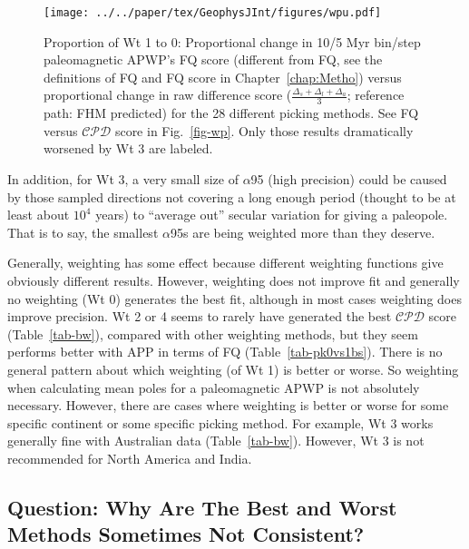\begin{figure}
  \vspace{-4mm}
  \captionsetup{skip=-10pt}
  \centering
  \texttt{[image: ../../paper/tex/GeophysJInt/figures/wpu.pdf]}
  \caption[Proportional changes of Wt 1 to 0: Paleomagnetic APWP's
    FQ score vs raw difference score]{Proportion of Wt 1 to 0:
    Proportional change in 10/5 Myr bin/step paleomagnetic APWP's FQ score
    (different from FQ, see the definitions of FQ and FQ score in
    Chapter~\ref{chap:Metho}) versus proportional change in raw difference score
    ($\frac{\Delta_s+\Delta_l+\Delta_a}{3}$; reference path: FHM predicted) for
    the 28 different picking methods. See FQ versus $\mathcal{CPD}$ score in
    Fig.~\ref{fig-wp}. Only those results dramatically worsened by Wt 3 are
    labeled.}\label{fig-wpu}
\end{figure}

In addition, for Wt 3, a very small size of $\alpha$95 (high precision) could be
caused by those sampled directions not covering a long enough period (thought to
be at least about $10^4$ years) to ``average out'' secular variation for giving
a paleopole. That is to say, the smallest $\alpha$95s are being weighted more
than they deserve.

Generally, weighting has some effect because different weighting functions give
obviously different results. However, weighting does not improve fit and
generally no weighting (Wt 0) generates the best fit, although in most cases
weighting does improve precision. Wt 2 or 4 seems to rarely have generated the
best $\mathcal{CPD}$ score (Table~\ref{tab-bw}), compared with other weighting
methods, but they seem performs better with APP in terms of FQ
(Table~\ref{tab-pk0vs1bs}). There is no general pattern about which weighting
(of Wt 1) is better or worse. So weighting when calculating mean
poles for a paleomagnetic APWP is not absolutely necessary. However, there are
cases where weighting is better or worse for some specific continent or some
specific picking method. For example, Wt 3 works generally fine with Australian
data (Table~\ref{tab-bw}). However, Wt 3 is not recommended for North America
and India.

\subsection{Question: Why Are The Best and Worst Methods Sometimes Not
Consistent?}

